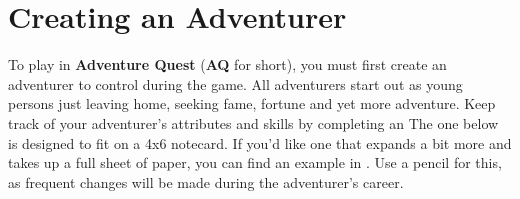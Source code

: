 \chapter{Creating an Adventurer}
\label{ch:create-adventurer}
To play in \textbf{Adventure Quest} (\textbf{AQ} for short), you must first create an adventurer to control during the game. All adventurers start out as young persons just leaving home, seeking fame, fortune and yet more adventure. Keep track of your adventurer's attributes and skills by completing an  The one below is designed to fit on a 4x6 notecard. If you'd like one that expands a bit more and takes up a full sheet of paper, you can find an example in . Use a pencil for this, as frequent changes will be made during the adventurer's career.

